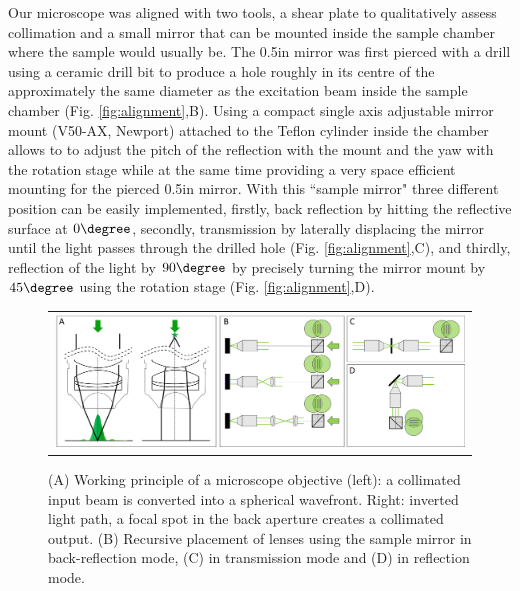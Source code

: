 \documentclass[12pt]{spieman}  %
\begin{document}
Our microscope was aligned with two tools, a shear plate to qualitatively assess collimation and a small mirror that can be mounted inside the sample chamber where the sample would usually be. The 0.5in mirror was first pierced with a drill using a ceramic drill bit to produce a hole roughly in its centre of the approximately the same diameter as the excitation beam inside the sample chamber (Fig. \ref{fig:alignment},B). Using a compact single axis adjustable mirror mount (V50-AX, Newport) attached to the Teflon cylinder inside the chamber allows to to adjust the pitch of the reflection with the mount and the yaw with the rotation stage while at the same time providing a very space efficient mounting for the pierced 0.5in mirror. With this ``sample mirror" three different position can be easily implemented, firstly, back reflection by hitting the reflective surface at $0\degree$, secondly, transmission by laterally displacing the mirror until the light passes through the drilled hole (Fig. \ref{fig:alignment},C), and thirdly, reflection of the light by $90\degree$ by precisely turning the mirror mount by $45\degree$ using the rotation stage (Fig. \ref{fig:alignment},D). 

\begin{figure}
   \begin{center}
   \begin{tabular}{c}
   \includegraphics[width=\textwidth]{Panel4.eps}
   \end{tabular}
   \end{center}
   \caption{\label{fig:alignment2} (A) Working principle of a microscope objective (left): a collimated input beam is converted into a spherical wavefront. Right: inverted light path, a focal spot in the back aperture creates a collimated output. (B) Recursive placement of lenses using the sample mirror in back-reflection mode, (C) in transmission mode and (D) in reflection mode.} 
   \end{figure}
\end{document}
